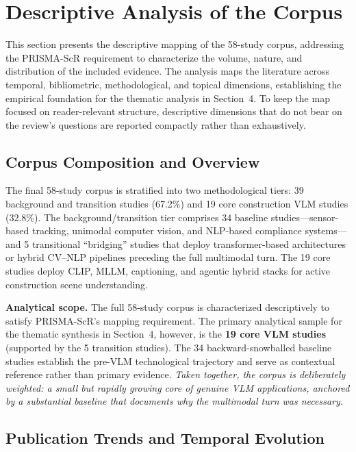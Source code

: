 \documentclass[10pt,letterpaper]{article}
\begin{document}
\section{Descriptive Analysis of the Corpus}

This section presents the descriptive mapping of the 58-study corpus, addressing the PRISMA-ScR requirement to characterize the volume, nature, and distribution of the included evidence. The analysis maps the literature across temporal, bibliometric, methodological, and topical dimensions, establishing the empirical foundation for the thematic analysis in Section~4. To keep the map focused on reader-relevant structure, descriptive dimensions that do not bear on the review's questions are reported compactly rather than exhaustively.

\subsection{Corpus Composition and Overview}

The final 58-study corpus is stratified into two methodological tiers: 39 background and transition studies (67.2\%) and 19 core construction VLM studies (32.8\%). The background/transition tier comprises 34 baseline studies---sensor-based tracking, unimodal computer vision, and NLP-based compliance systems---and 5 transitional ``bridging'' studies that deploy transformer-based architectures or hybrid CV--NLP pipelines preceding the full multimodal turn. The 19 core studies deploy CLIP, MLLM, captioning, and agentic hybrid stacks for active construction scene understanding.

\textbf{Analytical scope.} The full 58-study corpus is characterized descriptively to satisfy PRISMA-ScR's mapping requirement. The primary analytical sample for the thematic synthesis in Section~4, however, is the \textbf{19 core VLM studies} (supported by the 5 transition studies). The 34 backward-snowballed baseline studies establish the pre-VLM technological trajectory and serve as contextual reference rather than primary evidence. \textit{Taken together, the corpus is deliberately weighted: a small but rapidly growing core of genuine VLM applications, anchored by a substantial baseline that documents why the multimodal turn was necessary.}

\subsection{Publication Trends and Temporal Evolution}
\end{document}
